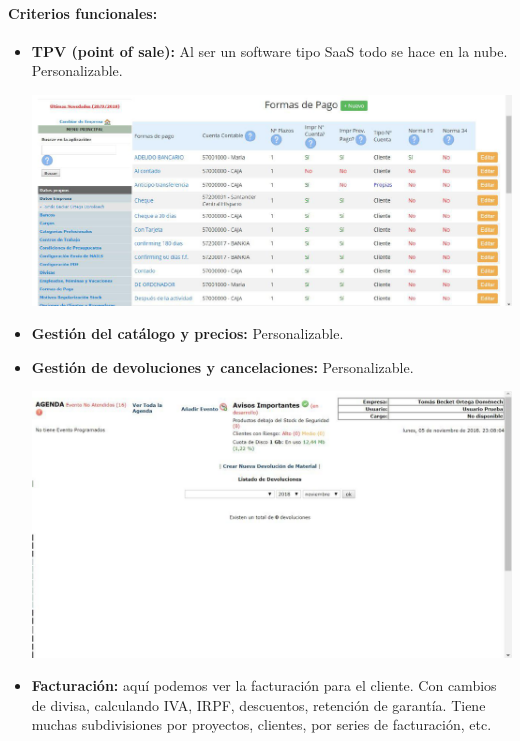 \documentclass{article}
\begin{document}
\paragraph{Criterios funcionales:}

\begin{itemize}

	\item \textbf{TPV (point of sale):} Al ser un software tipo SaaS todo se hace en la nube. Personalizable.
	\begin{flushleft}
		\includegraphics[scale=0.8]{imagenes/Gespymes2.jpg} 
	\end{flushleft}
	\item \textbf{Gestión del catálogo y precios:} Personalizable.
	\item \textbf{Gestión de devoluciones y cancelaciones:} Personalizable.
	\begin{flushleft}
		\includegraphics[scale=0.8]{imagenes/gespymes3.jpg} 
	\end{flushleft}
	\item \textbf{Facturación:} aquí podemos ver la facturación para el cliente. Con cambios de divisa, calculando IVA, IRPF, descuentos, retención de garantía. Tiene muchas subdivisiones por proyectos, clientes, por series de facturación, etc.

\end{itemize}
\end{document}
